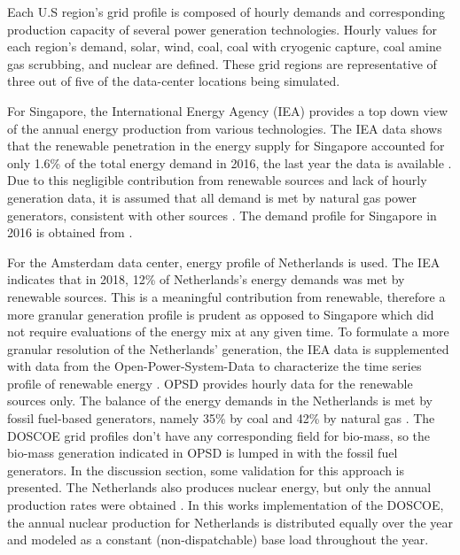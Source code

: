   Each U.S region's grid profile is composed of hourly demands and corresponding production capacity of several power generation technologies. Hourly values for each region’s demand, solar, wind, coal, coal with cryogenic capture, coal amine gas scrubbing, and nuclear are defined. These grid regions are representative of three out of five of the data-center locations being simulated. 
  
  For Singapore, the International Energy Agency (IEA) provides a top down view of the annual energy production from various technologies. The IEA data shows that the renewable penetration in the energy supply for Singapore accounted for only 1.6\% of the total energy demand in 2016, the last year the data is available \citep{IEA17}. Due to this negligible contribution from renewable sources and lack of hourly generation data, it is assumed that all demand is met by natural gas power generators, consistent with other sources \citep{eia20}. The demand profile for Singapore in 2016 is obtained from \citep{sin16}.

  For the Amsterdam data center, energy profile of Netherlands is used. The IEA indicates that in 2018, 12\% of Netherlands's energy demands was met by renewable sources. This is a meaningful contribution from renewable, therefore a more granular generation profile is prudent as opposed to Singapore which did not require evaluations of the energy mix at any given time.  To formulate a more granular resolution of the Netherlands' generation, the IEA data is supplemented with data from the Open-Power-System-Data to characterize the time series profile of renewable energy \citep{ospd19}. OPSD provides hourly data for the renewable sources only. The balance of the energy demands in the Netherlands is met by fossil fuel-based generators, namely 35\% by coal and 42\% by natural gas \citep{eia20b}. The DOSCOE grid profiles don’t have any corresponding field for bio-mass, so the bio-mass generation indicated in OPSD is lumped in with the fossil fuel generators. In the discussion section, some validation for this approach is presented. The Netherlands also produces nuclear energy, but only the annual production rates were obtained \citep{eia20b}. In this works implementation of the DOSCOE, the annual nuclear production for Netherlands is distributed equally over the year and modeled as a constant (non-dispatchable) base load throughout the year.  


